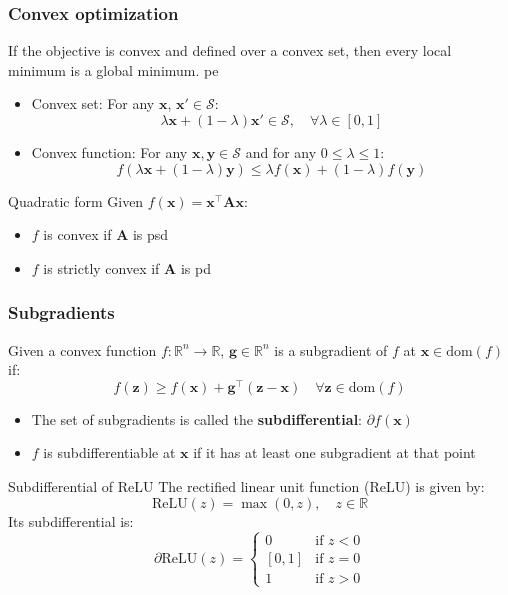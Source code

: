 \documentclass[smaller]{beamer}
\newcommand{\?}{\stackrel{?}{=}}
\newcommand{\la}{\lambda}
\newcommand{\mb}{\mathbb}
\newcommand{\mc}{\mathcal}
\newcommand{\tr}{^{\top}}
\newcommand{\pe}{\pause}
\begin{document}
\begin{frame}
  \frametitle{Convex optimization}
  \pe
  If the objective is convex and defined over a convex set, then every local minimum is a global minimum.
  pe
  \begin{itemize}
  \item Convex set: For any $\bm x$, $\bm x' \in \mc{S}$: \pe
    \begin{equation}
      \la \bm x + (1-\la)\bm x' \in \mc{S}, \quad \forall\la \in [0,1]
    \end{equation}
    \pe
  \item Convex function: For any $\bm x, \bm y \in \mc{S}$ and for any $0\le\la\le1$:\pe
    \begin{equation}
      f(\la\bm x + (1-\la)\bm y) \le \la f(\bm x) + (1-\la)f(\bm y)
    \end{equation}
  \end{itemize}
  \pe
  \begin{block}{Quadratic form}
    Given $f(\bm x)= \bm x\tr \bm A\bm x$:\pe
    \begin{itemize}
    \item $f$ is convex if $\bm A$ is psd
    \item $f$ is strictly convex if $\bm A$ is pd
    \end{itemize}
  \end{block}
\end{frame}

\begin{frame}
  \frametitle{Subgradients}
  \pe Given a convex function $f:\mb{R}^{n}\to \mb{R}$, $\bm g\in \mb{R}^{n}$ is a subgradient of $f$ at
  $\bm x \in \text{dom}(f)$ if:\pe
  \begin{equation}
    f(\bm z) \ge f(\bm x) + \bm g\tr(\bm z- \bm x)\quad \forall \bm z\in \text{dom}(f)
  \end{equation}
  \pe
  \begin{itemize}
  \item The set of subgradients is called the \textbf{subdifferential}: $\partial f(\bm x)$\pe
  \item   $f$ is subdifferentiable at $\bm x$ if it has at least one subgradient at that point
  \end{itemize}
  \pe
  \begin{exampleblock}{Subdifferential of ReLU}\pe
    The rectified linear unit function (ReLU) is given by:\pe
    \begin{equation}
      \text{ReLU}(z) = \max(0,z),\quad z\in\mb R
    \end{equation}\pe
    Its subdifferential is: \pe
    \begin{equation}
      \partial\text{ReLU}(z) =
      \begin{cases}
        0 & \text{if } z < 0 \\
        [0,1] & \text{if } z = 0 \\
        1 & \text{if } z > 0 
      \end{cases}
    \end{equation}
  \end{exampleblock}
\end{frame}
\end{document}
